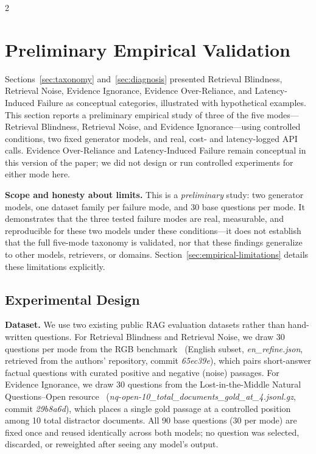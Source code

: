 \documentclass[11pt,a4paper]{article}
\begin{document}
\begin{multicols}{2}
\section{Preliminary Empirical Validation}
\label{sec:empirical}

Sections~\ref{sec:taxonomy} and~\ref{sec:diagnosis} presented Retrieval Blindness, Retrieval Noise, Evidence Ignorance, Evidence Over-Reliance, and Latency-Induced Failure as conceptual categories, illustrated with hypothetical examples. This section reports a preliminary empirical study of three of the five modes---Retrieval Blindness, Retrieval Noise, and Evidence Ignorance---using controlled conditions, two fixed generator models, and real, cost- and latency-logged API calls. Evidence Over-Reliance and Latency-Induced Failure remain conceptual in this version of the paper; we did not design or run controlled experiments for either mode here.

\textbf{Scope and honesty about limits.} This is a \textit{preliminary} study: two generator models, one dataset family per failure mode, and 30 base questions per mode. It demonstrates that the three tested failure modes are real, measurable, and reproducible for these two models under these conditions---it does not establish that the full five-mode taxonomy is validated, nor that these findings generalize to other models, retrievers, or domains. Section~\ref{sec:empirical-limitations} details these limitations explicitly.

\subsection{Experimental Design}
\label{sec:empirical-design}

\textbf{Dataset.} We use two existing public RAG evaluation datasets rather than hand-written questions. For Retrieval Blindness and Retrieval Noise, we draw 30 questions per mode from the RGB benchmark~\cite{rgb2024} (English subset, \textit{en\_refine.json}, retrieved from the authors' repository, commit \textit{65ec39e}), which pairs short-answer factual questions with curated positive and negative (noise) passages. For Evidence Ignorance, we draw 30 questions from the Lost-in-the-Middle Natural Questions--Open resource~\cite{liu2024lost} (\textit{nq-open-10\_total\_documents\_gold\_at\_4.jsonl.gz}, commit \textit{29b8a6d}), which places a single gold passage at a controlled position among 10 total distractor documents. All 90 base questions (30 per mode) are fixed once and reused identically across both models; no question was selected, discarded, or reweighted after seeing any model's output.


\end{multicols}
\end{document}
